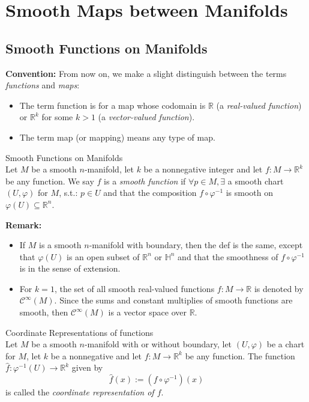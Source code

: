 \chapter{Smooth Maps between Manifolds}

\section{Smooth Functions on Manifolds}

\noindent \textbf{Convention:} From now on, we make a slight distinguish between the terms \textit{functions} and \textit{maps}:
\begin{itemize}
    \item The term function is for a map whose codomain is $\mathbb{R}$ (a \textit{real-valued function}) or $\mathbb{R}^k$ for some $k>1$ (a \textit{vector-valued function}).
    \item The term map (or mapping) means any type of map.
\end{itemize}

\begin{definition}{Smooth Functions on Manifolds}\\
Let $M$ be a smooth $n$-manifold, let $k$ be a nonnegative integer and let $f:M \to \mathbb{R}^k$ be any function. We say $f$ is a \textit{smooth function} if $\forall p\in M, \exists$ a smooth chart $(U,\varphi)$ for $M$, s.t.: $p\in U$ and that the composition $f\circ \varphi^{-1}$ is smooth on $\varphi(U) \subseteq \mathbb{R}^n$.
\end{definition}

\noindent\textbf{Remark:} \begin{itemize}
    \item If $M$ is a smooth $n$-manifold with boundary, then the def is the same, except that $\varphi(U)$ is an open subset of $\mathbb{R}^n$ or $\mathbb{H}^n$ and that the smoothness of $f\circ \varphi^{-1}$ is in the sense of extension.

    \item For $k=1$, the set of all smooth real-valued functions $f:M\to \mathbb{R}$ is denoted by $\mathcal{C}^\infty(M)$. Since the sums and constant multiplies of smooth functions are smooth, then $\mathcal{C}^\infty (M)$ is a vector space over $\mathbb{R}$.
\end{itemize}

\begin{definition}{Coordinate Representations of functions}\\
Let $M$ be a smooth $n$-manifold with or without boundary, let $(U,\varphi)$ be a chart for $M$, let $k$ be a nonnegative and let $f:M \to \mathbb{R}^k$ be any function. The function $\widehat{f}: \varphi^{-1} (U)\to \mathbb{R}^k$ given by
\[
\widehat{f} (x):= (f\circ \varphi^{-1}) (x)
\]
is called the \textit{coordinate representation of $f$}.
\end{definition}

